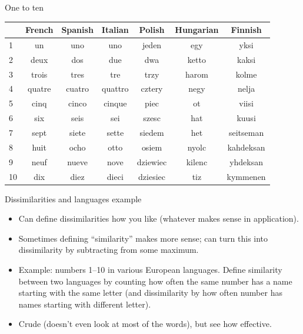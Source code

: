 \documentclass[pdf]{prosper}
\begin{document}
\begin{slide}{One to ten}

  \begin{tabular}{lcccccc}

    & French & Spanish & Italian & Polish & Hungarian & Finnish\\
\hline
    1 & un & uno & uno & jeden & egy & yksi\\
    2 & deux & dos & due & dwa & ketto & kaksi\\
    3 & trois & tres & tre & trzy &  harom & kolme\\
    4 & quatre & cuatro & quattro & cztery & negy & nelja\\
    5 & cinq & cinco & cinque & piec & ot & viisi\\
    6 & six & seis & sei & szesc & hat & kuusi\\
    7 & sept & siete & sette & siedem & het & seitseman \\
    8 & huit & ocho & otto & osiem & nyolc & kahdeksan\\
    9 & neuf & nueve & nove & dziewiec & kilenc & yhdeksan \\
    10 & dix & diez & dieci & dziesiec & tiz & kymmenen\\
    \hline
  \end{tabular}

\end{slide}


\begin{slide}{Dissimilarities and languages example}

  \begin{itemize}
  \item Can define dissimilarities how you like (whatever makes sense in application).
  \item Sometimes defining ``similarity'' makes more sense; can turn this into dissimilarity by subtracting from some maximum.
  \item Example: numbers 1--10 in various European languages. Define
    similarity between two languages by counting how often the same
    number has a name starting with the same letter (and dissimilarity
    by how often number has names starting with different letter).
  \item Crude (doesn't even look at most of the words), but see how effective.
  \end{itemize}
  
\end{slide}
\end{document}
